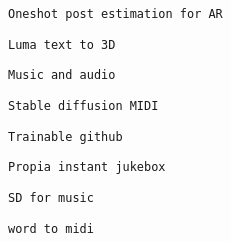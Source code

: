          
         
          \protect\hypertarget{ID_1593168578}{}{}

\begin{verbatim}
Oneshot post estimation for AR
\end{verbatim}
         

         
         
          \protect\hypertarget{ID_1463470740}{}{}

\begin{verbatim}
Luma text to 3D
\end{verbatim}
         
       

       
       
        \protect\hypertarget{ID_1812265856}{}{}

\begin{verbatim}
Music and audio
\end{verbatim}

         
         
          \protect\hypertarget{ID_306476459}{}{}

\begin{verbatim}
Stable diffusion MIDI
\end{verbatim}
         

         
         
          \protect\hypertarget{ID_670062475}{}{}

\begin{verbatim}
Trainable github
\end{verbatim}
         

         
         
          \protect\hypertarget{ID_1250365320}{}{}

\begin{verbatim}
Propia instant jukebox
\end{verbatim}
         

         
         
          \protect\hypertarget{ID_1345210060}{}{}

\begin{verbatim}
SD for music
\end{verbatim}
         

         
         
          \protect\hypertarget{ID_1992842005}{}{}

\begin{verbatim}
word to midi
\end{verbatim}
         

